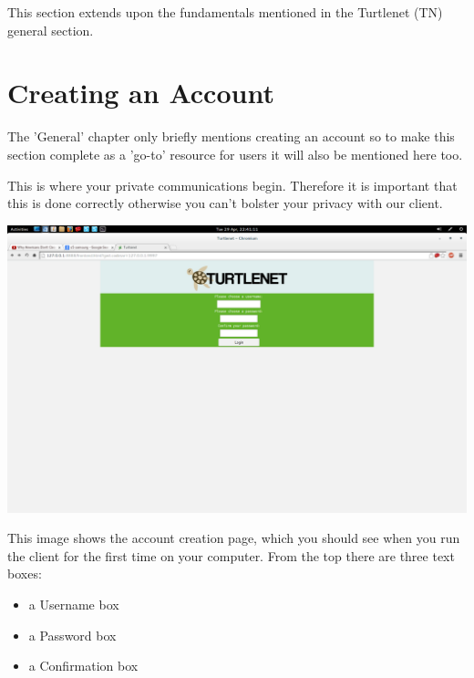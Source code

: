 This section extends upon the fundamentals mentioned in the Turtlenet (TN)
general section.

\section{Creating an Account}
The 'General' chapter only briefly mentions creating an account so to make this
section complete as a 'go-to' resource for users it will also be mentioned here
too.

This is where your private communications begin.  Therefore it is important that
this is done correctly otherwise you can't bolster your privacy with our client.

\includegraphics[scale=0.2]{../Screenshots/Screenshot from 2014-04-29 22-41-11}

This image shows the account creation page, which you should see when you run 
the client for the first time on your computer.  From the top there are three
text boxes:
\begin{itemize}
\item a Username box
\item a Password box
\item a Confirmation box
\end{itemize}

